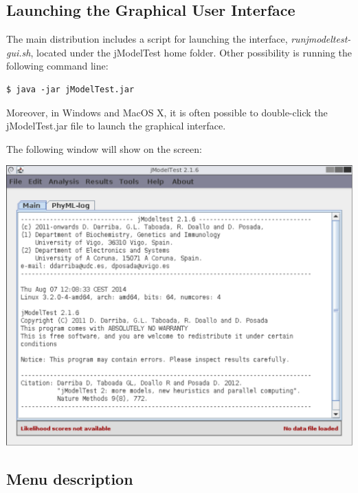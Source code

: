 \documentclass[10pt,twoside,a4paper]{article}
\begin{document}
\subsection{Launching the Graphical User Interface}

The main distribution includes a script for launching the interface,  \emph{runjmodeltest-gui.sh}, located under the jModelTest home folder. Other possibility is running the following command line:

\begin{lstlisting}
$ java -jar jModelTest.jar
\end{lstlisting}

Moreover, in Windows and MacOS X, it is often possible to double-click the jModelTest.jar file to launch the graphical interface.

The following window will show on the screen:

\begin{center}
\includegraphics[width=.9\textwidth]{images/main-window}
\end{center}

\subsection{Menu description}
\end{document}
